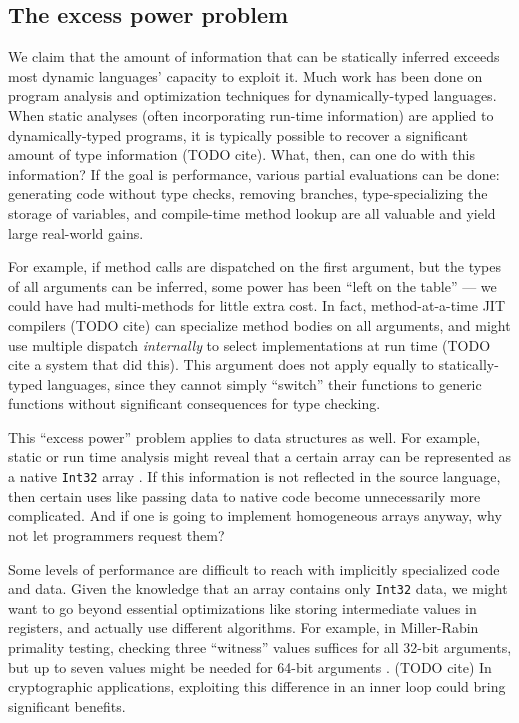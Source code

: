 
\subsection{The excess power problem}

We claim that the amount of information that can be statically inferred
exceeds most dynamic languages' capacity to exploit it.
Much work has been done on program analysis and optimization techniques
for dynamically-typed languages.
When static analyses (often incorporating run-time information) are applied
to dynamically-typed programs, it is typically possible to recover a
significant amount of type information (TODO cite).  What, then, can one
do with this information? If the goal is performance, various partial
evaluations can be done: generating code without type checks, removing
branches, type-specializing the storage of variables, and compile-time
method lookup are all valuable and yield large real-world gains.

 For example,
if method calls are dispatched on the first argument, but the types of all
arguments can be inferred, some power has been ``left on the table'' ---
we could have had multi-methods for little extra cost. In fact, method-at-a-time
JIT compilers (TODO cite)   can specialize method bodies on all arguments,
and might use multiple dispatch \emph{internally} to select implementations
at run time (TODO  cite a system that did this). This argument does not
apply equally to statically-typed languages, since they cannot simply
``switch'' their functions to generic functions without significant
consequences for type checking.

This ``excess power'' problem applies to data structures as well.
For example, static or run time analysis might reveal that a certain array
can be represented as a native \texttt{Int32} array \cite{Bolz2013}.
If this information is not reflected in the source language, then
certain uses like passing data to native code become unnecessarily more
complicated.
And if one is going to implement homogeneous arrays anyway, why not
let programmers request them?

Some levels of performance are difficult to reach with implicitly
specialized code and data. Given the knowledge that
an array contains only \texttt{Int32} data, we might want to go
beyond essential optimizations like storing intermediate values in
registers, and actually use different algorithms. For example,
in Miller-Rabin primality testing, checking three ``witness'' values
suffices for all 32-bit arguments, but up to seven values might be
needed for 64-bit arguments . (TODO cite)
In cryptographic applications, exploiting this difference in an inner loop
could bring significant benefits.



